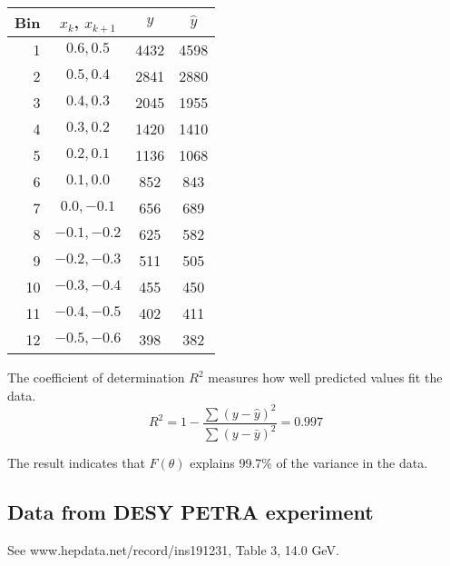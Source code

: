\documentclass[12pt]{article}
\begin{document}
\begin{center}
\begin{tabular}{|r|c|c|c|}
\hline
Bin & $x_k$, $x_{k+1}$ & $y$ & $\hat{y}$ \\
\hline
1 & $0.6, 0.5$ & 4432 & 4598\\
2 & $0.5, 0.4$ & 2841 & 2880\\
3 & $0.4, 0.3$ & 2045 & 1955\\
4 & $0.3, 0.2$ & 1420 & 1410\\
5 & $0.2, 0.1$ & 1136 & 1068\\
6 & $0.1, 0.0$ & 852 & 843\\
7 & $0.0, -0.1$ & 656 & 689\\
8 & $-0.1, -0.2$ & 625 & 582\\
9 & $-0.2, -0.3$ & 511 & 505\\
10 & $-0.3, -0.4$ & 455 & 450\\
11 & $-0.4, -0.5$ & 402 & 411\\
12 & $-0.5, -0.6$ & 398 & 382\\
\hline
\end{tabular}
\end{center}

The coefficient of determination $R^2$ measures how well predicted values fit the data.
\begin{equation*}
R^2=1-\frac{\sum(y-\hat{y})^2}{\sum(y-\bar{y})^2}=0.997
\end{equation*}

The result indicates that $F(\theta)$ explains
99.7\% of the variance in the data.

\subsection*{Data from DESY PETRA experiment}
See www.hepdata.net/record/ins191231, Table 3, 14.0 GeV.
\end{document}
